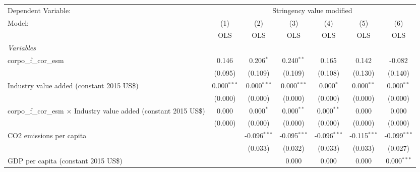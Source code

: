 
\begingroup
\centering
\begin{tabular}{lcccccc}
   \toprule
   Dependent Variable: & \multicolumn{6}{c}{Stringency value modified}\\
   Model:                                                                     & (1)           & (2)            & (3)            & (4)            & (5)            & (6)\\  
                                                                              &  OLS          & OLS            & OLS            & OLS            & OLS            & OLS\\  
   \midrule
   \emph{Variables}\\
   corpo\_f\_cor\_esm                                                         & 0.146         & 0.206$^{*}$    & 0.240$^{**}$   & 0.165          & 0.142          & -0.082\\   
                                                                              & (0.095)       & (0.109)        & (0.109)        & (0.108)        & (0.130)        & (0.140)\\   
   Industry value added (constant 2015 US\$)                                  & 0.000$^{***}$ & 0.000$^{***}$  & 0.000$^{***}$  & 0.000$^{*}$    & 0.000$^{**}$   & 0.000$^{**}$\\   
                                                                              & (0.000)       & (0.000)        & (0.000)        & (0.000)        & (0.000)        & (0.000)\\   
   corpo\_f\_cor\_esm $\times$ Industry value added (constant 2015 US\$)      & 0.000         & 0.000$^{*}$    & 0.000$^{**}$   & 0.000$^{**}$   & 0.000          & 0.000\\   
                                                                              & (0.000)       & (0.000)        & (0.000)        & (0.000)        & (0.000)        & (0.000)\\   
   CO2 emissions per capita                                                   &               & -0.096$^{***}$ & -0.095$^{***}$ & -0.096$^{***}$ & -0.115$^{***}$ & -0.099$^{***}$\\   
                                                                              &               & (0.033)        & (0.032)        & (0.033)        & (0.033)        & (0.027)\\   
   GDP per capita (constant 2015 US\$)                                        &               &                & 0.000          & 0.000          & 0.000          & 0.000$^{***}$\\   

\end{tabular}
